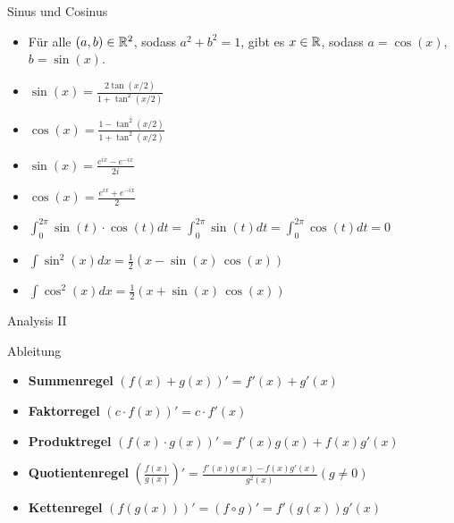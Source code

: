 \begin{Rechenregeln}{Sinus und Cosinus}{}
\begin{itemize}
    \item Für alle $(a,b)\in \mathbb{R}^2$, sodass $a^2+b^2 = 1$, gibt es $x\in\mathbb{R}$, sodass $a = \cos(x)$, $b = \sin(x)$.
    \item $\sin(x) = \frac{2\tan(x/2)}{1+\tan^2(x/2)}$
    \item $\cos(x) = \frac{1-\tan^2(x/2)}{1+\tan^2(x/2)}$
    \item $\sin(x) = \frac{e^{ix} - e^{-ix}}{2i}$
    \item $\cos(x) = \frac{e^{ix} + e^{-ix}}{2}$
    \item $\int_0^{2\pi} \sin(t)\cdot \cos(t) dt = \int_0^{2\pi} \sin(t) dt = \int_0^{2\pi} \cos(t) dt = 0$\\
    \item $\int \sin^2(x) dx = \frac{1}{2} (x-\sin(x) \, \cos(x))$\\
    \item $\int \cos^2(x) dx = \frac{1}{2} (x+\sin(x) \, \cos(x))$
    \end{itemize}
\end{Rechenregeln}

\begin{center}\begin{Huge}Analysis II\end{Huge}\end{center}

\begin{Rechenregeln}{Ableitung}{}
    \begin{itemize}
        \item \textbf{Summenregel} $(f(x)+g(x))' = f'(x) + g'(x)$
        \item \textbf{Faktorregel} $(c\cdot f(x))' = c\cdot f'(x)$
        \item \textbf{Produktregel} $(f(x)\cdot g(x))' = f'(x)g(x) + f(x)g'(x)$
        \item \textbf{Quotientenregel} $\left(\frac{f(x)}{g(x)}\right)' = \frac{f'(x)g(x) - f(x)g'(x)}{g^2(x)}(g\neq 0)$
        \item \textbf{Kettenregel} $(f(g(x)))' = (f\circ g)' = f'(g(x))g'(x)$
    \end{itemize}
\end{Rechenregeln}

